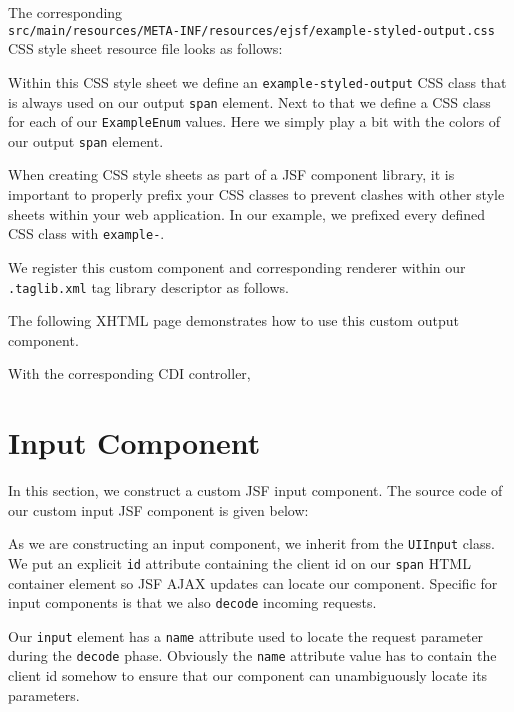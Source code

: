 The corresponding\\
\texttt{src/main/resources/META-INF/resources/ejsf/example-styled-output.css}\\
CSS style sheet resource file looks as follows:

Within this CSS style sheet we define an \texttt{example-styled-output} CSS class that is always used on our output \texttt{span} element.
Next to that we define a CSS class for each of our \texttt{ExampleEnum} values.
Here we simply play a bit with the colors of our output \texttt{span} element.

When creating CSS style sheets as part of a JSF component library, it is important to properly prefix your CSS classes to prevent clashes with other style sheets within your web application.
In our example, we prefixed every defined CSS class with \texttt{example-}.

We register this custom component and corresponding renderer within our \texttt{.taglib\allowbreak.xml} tag library descriptor as follows.


The following XHTML page demonstrates how to use this custom output component.


With the corresponding CDI controller,



\section{Input Component}
In this section, we construct a custom JSF input component.
The source code of our custom input JSF component is given below:

As we are constructing an input component, we inherit from the \texttt{UIInput} class.
We put an explicit \texttt{id} attribute containing the client id on our \texttt{span} HTML container element so JSF AJAX updates can locate our component.
Specific for input components is that we also \texttt{decode} incoming requests.

Our \texttt{input} element has a \texttt{name} attribute used to locate the request parameter during the \texttt{decode} phase.
Obviously the \texttt{name} attribute value has to contain the client id somehow to ensure that our component can unambiguously locate its parameters.

